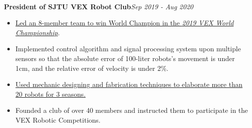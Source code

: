 \documentclass[10pt,a4paper]{article}
\begin{document}
\noindent\\
\textbf{President of SJTU VEX Robot Club}\hfill\emph{Sep 2019 - Aug 2020}
\begin{itemize}[noitemsep,topsep=0pt]
    \item \href{https://www.youtube.com/watch?v=7ysdbzLXAT4}{Led an 8-member team to win World Champion in the \emph{2019 VEX World Championship}}.
    \item Implemented control algorithm and signal processing system upon multiple sensors so that the absolute error of 100-liter robots's movement is under 1cm, and the relative error of velocity is under 2\%.
    \item \href{https://www.robotevents.com/teams/VEXU/SJTU1}{Used mechanic designing and fabrication techniques to elaborate more than 20 robots for 3 seasons.}
    \item Founded a club of over 40 members and instructed them to participate in the VEX Robotic Competitions.
\end{itemize}
\end{document}
